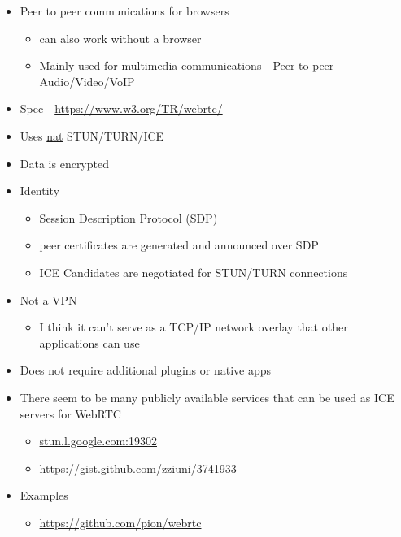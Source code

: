 \begin{itemize}
\tightlist
\item
  Peer to peer communications for browsers

  \begin{itemize}
  \tightlist
  \item
    can also work without a browser
  \item
    Mainly used for multimedia communications - Peer-to-peer
    Audio/Video/VoIP
  \end{itemize}
\item
  Spec -
  \href{https://www.w3.org/TR/webrtc/\#persistent-information-exposed-by-webrtc}{https://www.w3.org/TR/webrtc/}
\item
  Uses \href{notes/0202-nat}{nat} STUN/TURN/ICE
\item
  Data is encrypted
\item
  Identity

  \begin{itemize}
  \tightlist
  \item
    Session Description Protocol (SDP)
  \item
    peer certificates are generated and announced over SDP
  \item
    ICE Candidates are negotiated for STUN/TURN connections
  \end{itemize}
\item
  Not a VPN

  \begin{itemize}
  \tightlist
  \item
    I think it can't serve as a TCP/IP network overlay that other
    applications can use
  \end{itemize}
\item
  Does not require additional plugins or native apps
\item
  There seem to be many publicly available services that can be used as
  ICE servers for WebRTC

  \begin{itemize}
  \tightlist
  \item
    \href{http://stun.l.google.com:19302/}{stun.l.google.com:19302}
  \item
    \url{https://gist.github.com/zziuni/3741933}
  \end{itemize}
\item
  Examples

  \begin{itemize}
  \tightlist
  \item
    \url{https://github.com/pion/webrtc}


\end{itemize}
\end{itemize}
